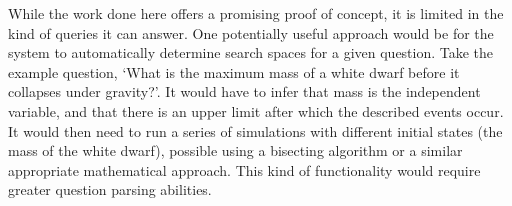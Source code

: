 \documentclass{article}
\begin{document}
    While the work done here offers a promising proof of concept, it is limited in the kind of queries it can answer. One potentially useful approach would be for the system to automatically determine search spaces for a given question. Take the example question, `What is the maximum mass of a white dwarf before it collapses under gravity?'. It would have to infer that mass is the independent variable, and that there is an upper limit after which the described events occur. It would then need to run a series of simulations with different initial states (the mass of the white dwarf), possible using a bisecting algorithm or a similar appropriate mathematical approach. This kind of functionality would require greater question parsing abilities.

    
    
\end{document}
